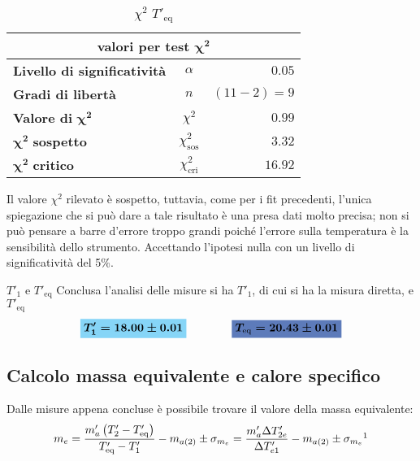 \documentclass{article}
\newcommand{\azzurro}[1]{\colorbox{mylightblue}{$\displaystyle #1$}}
\newcommand{\blu}[1]{\colorbox{myblue}{$\displaystyle #1$}}
\begin{document}
	
	\begin{table}[H] \centering
		\begin{small}
			\begin{tabular}{@{}lcr@{}}\toprule
				\multicolumn{3}{c}{\textbf{valori per test} \(\boldsymbol{\chi^2}\)}\\ \midrule
				\textbf{Livello di significatività}		 &  \(\alpha\) &\(0.05\) \\  \hdashline
				\textbf{Gradi di libertà}		 & \(n\)  &\((11-2) = 9\) \\   \hdashline
				\textbf{Valore di} \(\boldsymbol{\chi^2}\)	 & \(\chi^2\)  &\(0.99\)\\  \hdashline
				\(\boldsymbol{\chi^2}\) \textbf{sospetto}		& \(\chi^2_{\text{sos}}\)  &\(3.32\)\\ \hdashline
				\(\boldsymbol{\chi^2}\) \textbf{critico}		& \(\chi^2_{\text{cri}}\)  &\(16.92\)\\ 
				\bottomrule
			\end{tabular}
		\end{small}
		\caption{\(\chi^2\) \(T'_{\text{eq}}\)}
	\end{table}
	
	\noindent
	Il valore \(\chi^2\) rilevato è sospetto, tuttavia, come per i fit precedenti, l'unica spiegazione che si può dare a tale risultato è una presa dati molto precisa; non si può pensare a barre d'errore troppo grandi poiché l'errore sulla temperatura è la sensibilità dello strumento. Accettando l'ipotesi nulla con un livello di significatività del 5\%.
	
	
	\begin{es}{\(T'_{1}\) e \(T'_{\text{eq}}\)}
		Conclusa l'analisi delle misure si ha \(T'_{1}\), di cui si ha la misura diretta, e \(T'_{\text{eq}}\)
		\[ 
		\azzurro{\boldsymbol{T'_{1} = 18.00 \pm 0.01}}\qquad \qquad \blu{\boldsymbol{T_{\text{eq}} = 20.43 \pm 0.01}}
		\]
	\end{es}
	
	
	\subsection{Calcolo massa equivalente e calore specifico}\label{calcolo me e cx}
	Dalle misure appena concluse è possibile trovare il valore della massa equivalente:
	\[ 
	m_{e} = \frac{m'_{a}\left(T'_{2} - T'_{\text{eq}}\right)}{T'_{\text{eq}} - T'_{1}} - m_{a(2)} \pm \sigma_{m_e} =  \frac{m'_{a}\Delta T'_{2e}}{\Delta T'_{e1}} - m_{a(2)}\pm \sigma_{m_e} \footnotemark\footnotetext{\label{errore in appendice}Lo sviluppo dell'errore di \(m_{e}\) e di \(c_{x}\) è riportato in appendice (\ref{sigma me})}
	\]
\end{document}
